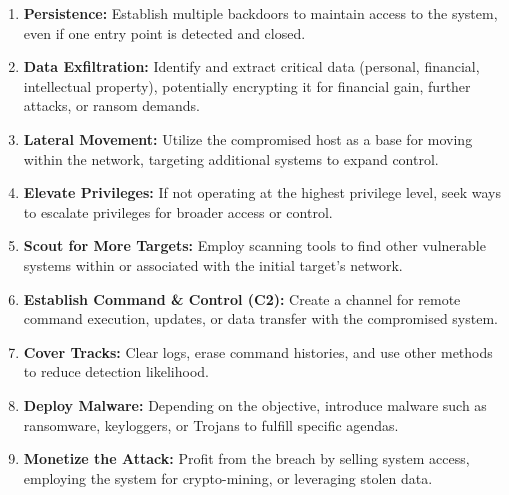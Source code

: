 \begin{enumerate}
    \item \textbf{Persistence:}
          Establish multiple backdoors to maintain access to the system, even if one entry point is detected and closed.

    \item \textbf{Data Exfiltration:}
          Identify and extract critical data (personal, financial, intellectual property), potentially encrypting it for financial gain, further attacks, or ransom demands.

    \item \textbf{Lateral Movement:}
          Utilize the compromised host as a base for moving within the network, targeting additional systems to expand control.

    \item \textbf{Elevate Privileges:}
          If not operating at the highest privilege level, seek ways to escalate privileges for broader access or control.

    \item \textbf{Scout for More Targets:}
          Employ scanning tools to find other vulnerable systems within or associated with the initial target's network.

    \item \textbf{Establish Command \& Control (C2):}
          Create a channel for remote command execution, updates, or data transfer with the compromised system.

    \item \textbf{Cover Tracks:}
          Clear logs, erase command histories, and use other methods to reduce detection likelihood.

    \item \textbf{Deploy Malware:}
          Depending on the objective, introduce malware such as ransomware, keyloggers, or Trojans to fulfill specific agendas.

    \item \textbf{Monetize the Attack:}
          Profit from the breach by selling system access, employing the system for crypto-mining, or leveraging stolen data.
\end{enumerate}

